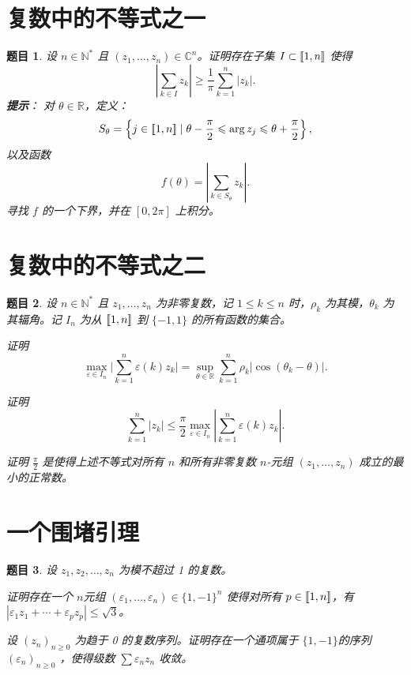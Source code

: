 \documentclass[12pt,UTF8]{ctexbook}
\theoremstyle{exercisestyle}
\newtheorem*{exercise}{题目}
\theoremstyle{solutionstyle}
\begin{document}
\section{复数中的不等式之一}
\begin{exercise}
设 \( n \in \mathbb{N}^* \) 且 \( (z_1, \ldots, z_n) \in \mathbb{C}^n \)。证明存在子集 \( I \subset [\![1,n]\!] \) 使得
\[
\left| \sum_{k \in I} z_k \right| \geqslant \frac{1}{\pi} \sum_{k=1}^n |z_k|.
\]
\textbf{提示}：
对 \(\theta \in \mathbb{R}\)，定义：
\[
S_{\theta} = \left\{ j \in[\![1,n]\!] \mid \theta - \frac{\pi}{2} \leqslant \arg z_j \leqslant \theta + \frac{\pi}{2} \right\},
\]
以及函数
\[
f(\theta) = \left| \sum_{k \in S_{\theta}} z_k \right|.
\]
寻找 \( f \) 的一个下界，并在 \([0, 2\pi]\) 上积分。
\end{exercise}

\section{复数中的不等式之二}
\begin{exercise}
设 \( n \in \mathbb{N}^* \) 且 \( z_1, \ldots, z_n \) 为非零复数，记 \( 1 \leq k \leq n \) 时，\( \rho_k \) 为其模，\( \theta_k \) 为其辐角。记 \( I_n \) 为从 \([\![1,n]\!]\) 到 \(\{-1, 1\}\) 的所有函数的集合。
\begin{subquestions}
\item 证明
\[
\max_{\varepsilon \in I_n} \Big| \sum_{k=1}^n \varepsilon(k) z_k \Big| = \sup_{\theta \in \mathbb{R}} \sum_{k=1}^n \rho_k |\cos(\theta_k - \theta)|.
\]

\item 证明
\[
\sum_{k=1}^{n} |z_k| \leqslant \frac{\pi}{2} \max_{\varepsilon \in I_n} \left| \sum_{k=1}^{n} \varepsilon(k) z_k \right|.
\]

\item 证明 \( \displaystyle\frac{\pi}{2} \) 是使得上述不等式对所有 \( n \) 和所有非零复数 \( n \)-元组 \( (z_1,\ldots,z_n) \) 成立的最小的正常数。
\end{subquestions}
\end{exercise}

\section{一个围堵引理}
\begin{exercise}
设 \( z_1, z_2, \ldots, z_n \) 为模不超过 1 的复数。
\begin{subquestions}
\item 证明存在一个 \( n \)元组 \( (\varepsilon_1, \ldots, \varepsilon_n) \in \{1, -1\}^n \) 使得对所有 \( p \in [\![1,n]\!] \)，有 \( |\varepsilon_1 z_1 + \cdots + \varepsilon_p z_p| \leqslant \sqrt{3} \)。
\item 设 \( (z_n)_{n \geq 0} \) 为趋于 0 的复数序列。证明存在一个通项属于 \( \{1, -1\} \)的序列 \( (\varepsilon_n)_{n \geqslant 0} \) ，使得级数 \( \sum \varepsilon_n z_n \) 收敛。
\end{subquestions}
\end{exercise}
\end{document}

